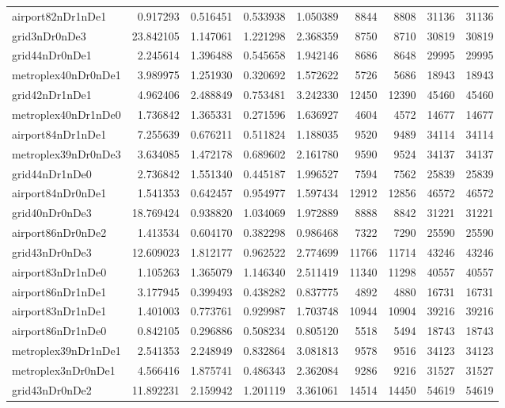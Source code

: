 \begin{longtable}{|l|r|r|r|r|r|r|r|r|}
airport82nDr1nDe1 & 0.917293 & 0.516451 & 0.533938 & 1.050389 & 8844 & 8808 & 31136 & 31136 \\
grid3nDr0nDe3 & 23.842105 & 1.147061 & 1.221298 & 2.368359 & 8750 & 8710 & 30819 & 30819 \\
grid44nDr0nDe1 & 2.245614 & 1.396488 & 0.545658 & 1.942146 & 8686 & 8648 & 29995 & 29995 \\
metroplex40nDr0nDe1 & 3.989975 & 1.251930 & 0.320692 & 1.572622 & 5726 & 5686 & 18943 & 18943 \\
grid42nDr1nDe1 & 4.962406 & 2.488849 & 0.753481 & 3.242330 & 12450 & 12390 & 45460 & 45460 \\
metroplex40nDr1nDe0 & 1.736842 & 1.365331 & 0.271596 & 1.636927 & 4604 & 4572 & 14677 & 14677 \\
airport84nDr1nDe1 & 7.255639 & 0.676211 & 0.511824 & 1.188035 & 9520 & 9489 & 34114 & 34114 \\
metroplex39nDr0nDe3 & 3.634085 & 1.472178 & 0.689602 & 2.161780 & 9590 & 9524 & 34137 & 34137 \\
grid44nDr1nDe0 & 2.736842 & 1.551340 & 0.445187 & 1.996527 & 7594 & 7562 & 25839 & 25839 \\
airport84nDr0nDe1 & 1.541353 & 0.642457 & 0.954977 & 1.597434 & 12912 & 12856 & 46572 & 46572 \\
grid40nDr0nDe3 & 18.769424 & 0.938820 & 1.034069 & 1.972889 & 8888 & 8842 & 31221 & 31221 \\
airport86nDr0nDe2 & 1.413534 & 0.604170 & 0.382298 & 0.986468 & 7322 & 7290 & 25590 & 25590 \\
grid43nDr0nDe3 & 12.609023 & 1.812177 & 0.962522 & 2.774699 & 11766 & 11714 & 43246 & 43246 \\
airport83nDr1nDe0 & 1.105263 & 1.365079 & 1.146340 & 2.511419 & 11340 & 11298 & 40557 & 40557 \\
airport86nDr1nDe1 & 3.177945 & 0.399493 & 0.438282 & 0.837775 & 4892 & 4880 & 16731 & 16731 \\
airport83nDr1nDe1 & 1.401003 & 0.773761 & 0.929987 & 1.703748 & 10944 & 10904 & 39216 & 39216 \\
airport86nDr1nDe0 & 0.842105 & 0.296886 & 0.508234 & 0.805120 & 5518 & 5494 & 18743 & 18743 \\
metroplex39nDr1nDe1 & 2.541353 & 2.248949 & 0.832864 & 3.081813 & 9578 & 9516 & 34123 & 34123 \\
metroplex3nDr0nDe1 & 4.566416 & 1.875741 & 0.486343 & 2.362084 & 9286 & 9216 & 31527 & 31527 \\
grid43nDr0nDe2 & 11.892231 & 2.159942 & 1.201119 & 3.361061 & 14514 & 14450 & 54619 & 54619 \\

\end{longtable}
